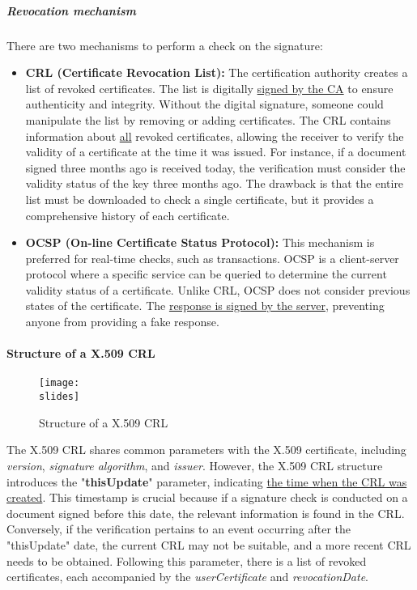 \subparagraph{Revocation mechanism}
There are two mechanisms to perform a check on the signature:

\begin{itemize}
    \item \textbf{CRL (Certificate Revocation List):} The certification authority creates a list of revoked certificates. The list is digitally \underline{signed by the CA} to ensure authenticity and integrity. Without the digital signature, someone could manipulate the list by removing or adding certificates. The CRL contains information about \underline{all} revoked certificates, allowing the receiver to verify the validity of a certificate at the time it was issued. For instance, if a document signed three months ago is received today, the verification must consider the validity status of the key three months ago. The drawback is that the entire list must be downloaded to check a single certificate, but it provides a comprehensive history of each certificate.

    \item \textbf{OCSP (On-line Certificate Status Protocol):} This mechanism is preferred for real-time checks, such as transactions. OCSP is a client-server protocol where a specific service can be queried to determine the current validity status of a certificate. Unlike CRL, OCSP does not consider previous states of the certificate. The \underline{response is signed by the server}, preventing anyone from providing a fake response.
\end{itemize}



\paragraph{Structure of a X.509 CRL}
\begin{figure}[h]
    \centering
    \texttt{[image: \\slides]}
    \caption{Structure of a X.509 CRL}
\end{figure}

The X.509 CRL shares common parameters with the X.509 certificate, including \textit{version}, \textit{signature algorithm}, and \textit{issuer}.
However, the X.509 CRL structure introduces the "\textbf{thisUpdate}" parameter, indicating \underline{the time when the CRL was created}. 
This timestamp is crucial because if a signature check is conducted on a document signed before this date, the relevant information is found in the CRL. Conversely, if the verification pertains to an event occurring after the "thisUpdate" date, the current CRL may not be suitable, and a more recent CRL needs to be obtained. Following this parameter, there is a list of revoked certificates, each accompanied by the \textit{userCertificate} and \textit{revocationDate}.



